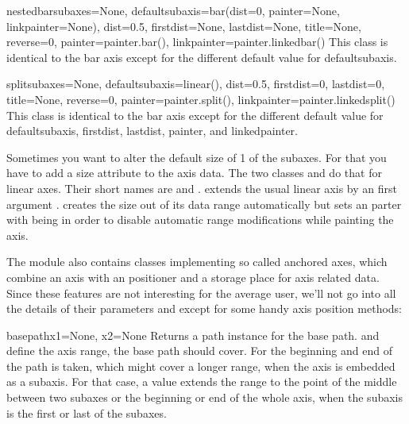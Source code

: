\begin{classdesc}{nestedbar}{subaxes=None,
                             defaultsubaxis=bar(dist=0, painter=None, linkpainter=None),
                             dist=0.5, firstdist=None, lastdist=None,
                             title=None, reverse=0,
                             painter=painter.bar(),
                             linkpainter=painter.linkedbar()}
   This class is identical to the bar axis except for the different
   default value for defaultsubaxis.
\end{classdesc}

\begin{classdesc}{split}{subaxes=None,
                         defaultsubaxis=linear(),
                         dist=0.5, firstdist=0, lastdist=0,
                         title=None, reverse=0,
                         painter=painter.split(),
                         linkpainter=painter.linkedsplit()}
   This class is identical to the bar axis except for the different
   default value for defaultsubaxis, firstdist, lastdist, painter, and
   linkedpainter.
\end{classdesc}

Sometimes you want to alter the default size of 1 of the subaxes. For
that you have to add a size attribute to the axis data. The two
classes  and  do that for
linear axes. Their short names are  and
.  extends the usual linear
axis by an first argument .  creates
the size out of its data range automatically but sets an
 parter with  being  in
order to disable automatic range modifications while painting the
axis.

The  module also contains classes implementing so called
anchored axes, which combine an axis with an positioner and a storage
place for axis related data. Since these features are not interesting
for the average \PyX{} user, we'll not go into all the details of
their parameters and except for some handy axis position methods:

\begin{methoddesc}[anchoredaxis]{basepath}{x1=None, x2=None}
  Returns a path instance for the base path.  and 
  define the axis range, the base path should cover. For 
  the beginning and end of the path is taken, which might cover a
  longer range, when the axis is embedded as a subaxis. For that case,
  a  value extends the range to the point of the middle
  between two subaxes or the beginning or end of the whole axis, when
  the subaxis is the first or last of the subaxes.
\end{methoddesc}

